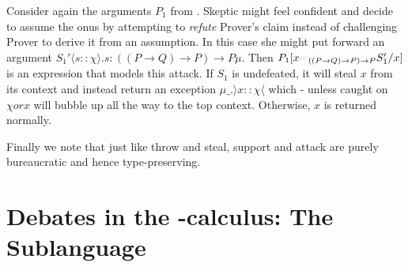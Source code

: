 \documentclass{IOS-Book-Article}
\begin{document}
  \begin{example}[Attack]
    Consider again the arguments $P_1$ from . Skeptic might feel confident and decide to assume the onus by attempting to \emph{refute} Prover's claim instead of challenging Prover to derive it from an assumption. In this case she might put forward an argument $S_1'\langle s:: \chi\rangle.s: ((P\rightarrow Q)\rightarrow P)\rightarrow P \mu$. Then $P_1[x\leftattack_{((P\rightarrow Q)\rightarrow P)\rightarrow P} S_1' /x]$ is an expression that models this attack. If $S_1$ is undefeated, it will steal $x$ from its context and instead return an exception $\mu\_.\rangle x :: \chi\langle$ which - unless caught on $\chi or x$ will bubble up all the way to the top context. Otherwise, $x$ is returned normally.
  \end{example}

  Finally we note that just like throw and steal, support and attack are purely bureaucratic and hence type-preserving.




\section{Debates in the \matilda-calculus: The \ACDC Sublanguage}\label{sec:debat-matilda-calc}
\end{document}
